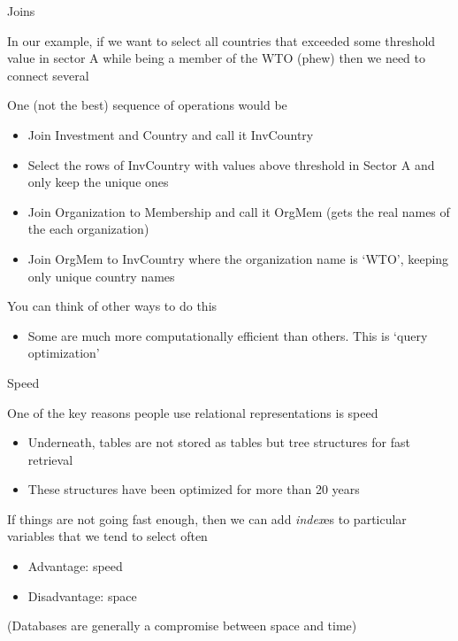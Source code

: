 \documentclass{hertieteaching}
\begin{document}
\begin{frame}{Joins}

In our example, if we want to select all countries that exceeded some threshold value in sector A while being a member of the WTO (phew) then we need to connect several
	
One (not the best) sequence of operations would be
\begin{itemize}
  \item Join \textsf{Investment} and \textsf{Country} and call it \textsf{InvCountry}
  \item Select the rows of \textsf{InvCountry} with values above threshold in  Sector A and only keep the unique ones
  \item Join \textsf{Organization} to \textsf{Membership} and call it \textsf{OrgMem} (gets the real names of the each organization)
  \item Join \textsf{OrgMem} to \textsf{InvCountry} where the organization name is `WTO', keeping only unique country names 
\end{itemize}

You can think of other ways to do this
\begin{itemize}
  \item Some are much more computationally efficient than others. This is `query optimization'
\end{itemize}

	
\end{frame}

\begin{frame}{Speed}

One of the key reasons people use relational representations is speed
\begin{itemize}
  \item Underneath, tables are not stored as tables but tree structures for fast retrieval
  \item These structures have been optimized for more than 20 years
\end{itemize}
If things are not going fast enough, then we can add
\textit{index}es to particular variables that we tend to select often
\begin{itemize}
  \item Advantage: speed
  \item Disadvantage: space
\end{itemize}
(Databases are generally a compromise between space and time)




	
\end{frame}
\end{document}
